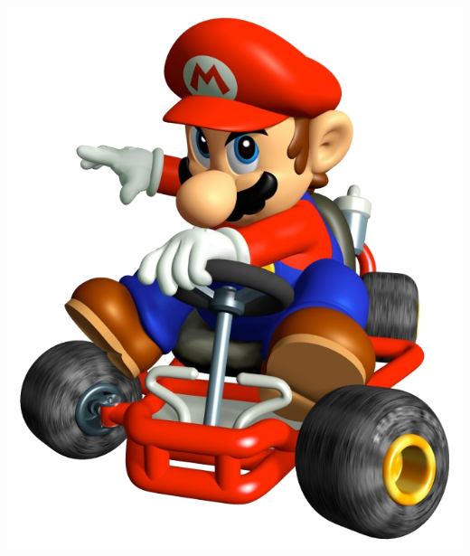 \documentclass{beamer}
\begin{document}
\begin{frame}
\begin{center}
\includegraphics[width=.70\textwidth]{Images/Mario}
\end{center}
\end{frame}
\end{document}
